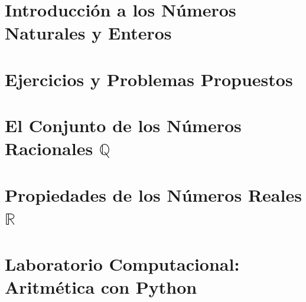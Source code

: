 \section{Introducción a los Números Naturales y Enteros}



\section{Ejercicios y Problemas Propuestos}



\section{El Conjunto de los Números Racionales $\mathbb{Q}$}



\newpage %




\section{Propiedades de los Números Reales \texorpdfstring{$\mathbb{R}$}{R}}



\section{Laboratorio Computacional: Aritmética con Python}

